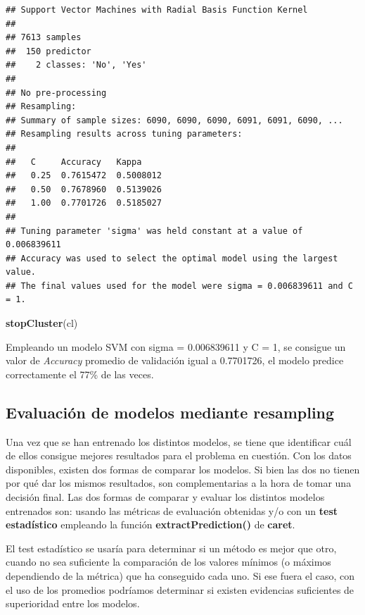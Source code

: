 \documentclass[]{article}
\newenvironment{Shaded}{\begin{snugshade}}{\end{snugshade}}
\newcommand{\KeywordTok}[1]{\textcolor[rgb]{0.13,0.29,0.53}{\textbf{#1}}}
\newcommand{\NormalTok}[1]{#1}
\begin{document}
\begin{verbatim}
## Support Vector Machines with Radial Basis Function Kernel 
## 
## 7613 samples
##  150 predictor
##    2 classes: 'No', 'Yes' 
## 
## No pre-processing
## Resampling: 
## Summary of sample sizes: 6090, 6090, 6090, 6091, 6091, 6090, ... 
## Resampling results across tuning parameters:
## 
##   C     Accuracy   Kappa    
##   0.25  0.7615472  0.5008012
##   0.50  0.7678960  0.5139026
##   1.00  0.7701726  0.5185027
## 
## Tuning parameter 'sigma' was held constant at a value of 0.006839611
## Accuracy was used to select the optimal model using the largest value.
## The final values used for the model were sigma = 0.006839611 and C = 1.
\end{verbatim}

\begin{Shaded}
\begin{Highlighting}[]
\KeywordTok{stopCluster}\NormalTok{(cl)}
\end{Highlighting}
\end{Shaded}

Empleando un modelo SVM con sigma = 0.006839611 y C = 1, se
consigue un valor de \emph{Accuracy} promedio de validación igual a 0.7701726, el
modelo predice correctamente el 77\% de las veces.

\hypertarget{evaluaciuxf3n-de-modelos-mediante-resampling}{%
\subsection{Evaluación de modelos mediante
resampling}\label{evaluaciuxf3n-de-modelos-mediante-resampling}}

Una vez que se han entrenado los distintos modelos, se tiene que
identificar cuál de ellos consigue mejores resultados para el problema
en cuestión. Con los datos disponibles, existen dos formas de comparar
los modelos. Si bien las dos no tienen por qué dar los mismos
resultados, son complementarias a la hora de tomar una decisión final.
Las dos formas de comparar y evaluar los distintos modelos entrenados
son: usando las métricas de evaluación obtenidas y/o con un \textbf{test estadístico}
 empleando la función \textbf{extractPrediction()} de \textbf{caret}.

El test estadístico se usaría para determinar si un método es mejor que otro, cuando no sea suficiente la comparación de los valores mínimos (o máximos dependiendo de la métrica) que ha conseguido cada uno. Si ese fuera el caso, con el uso de los promedios podríamos determinar si existen evidencias suficientes de superioridad entre los modelos.
\end{document}
